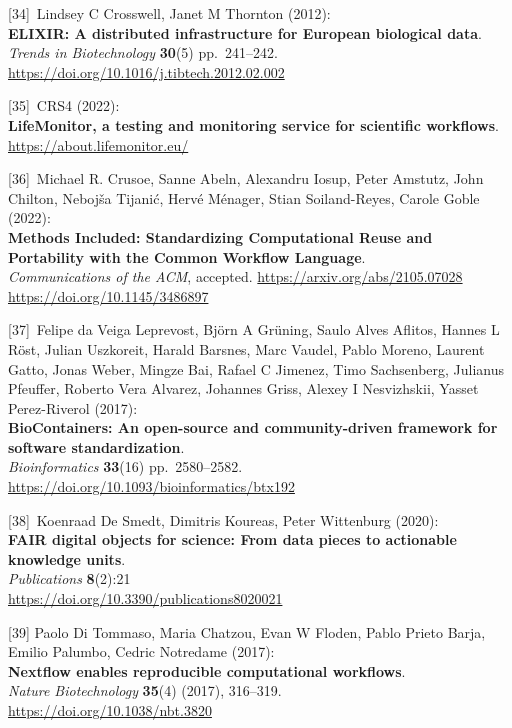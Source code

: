 {[}34{]}~Lindsey C Crosswell, Janet M Thornton (2012):\\
\textbf{ELIXIR: A distributed infrastructure for European biological
data}.\\
\emph{Trends in Biotechnology} \textbf{30}(5) pp.~241--242.\\
\url{https://doi.org/10.1016/j.tibtech.2012.02.002}

{[}35{]}~CRS4 (2022):\\
\textbf{LifeMonitor, a testing and monitoring service for scientific
workflows}.\\
\url{https://about.lifemonitor.eu/}

{[}36{]}~Michael R. Crusoe, Sanne Abeln, Alexandru Iosup, Peter Amstutz,
John Chilton, Nebojša Tijanić, Hervé Ménager, Stian Soiland-Reyes,
Carole Goble (2022):\\
\textbf{Methods Included: Standardizing Computational Reuse and
Portability with the Common Workflow Language}.\\
\emph{Communications of the ACM}, accepted.
\url{https://arxiv.org/abs/2105.07028}\\
\url{https://doi.org/10.1145/3486897}

{[}37{]}~Felipe da Veiga Leprevost, Björn A Grüning, Saulo Alves
Aflitos, Hannes L Röst, Julian Uszkoreit, Harald Barsnes, Marc Vaudel,
Pablo Moreno, Laurent Gatto, Jonas Weber, Mingze Bai, Rafael C Jimenez,
Timo Sachsenberg, Julianus Pfeuffer, Roberto Vera Alvarez, Johannes
Griss, Alexey I Nesvizhskii, Yasset Perez-Riverol (2017):\\
\textbf{BioContainers: An open-source and community-driven framework for
software standardization}.\\
\emph{Bioinformatics} \textbf{33}(16) pp.~2580--2582.\\
\url{https://doi.org/10.1093/bioinformatics/btx192}

{[}38{]}~Koenraad De Smedt, Dimitris Koureas, Peter Wittenburg (2020):\\
\textbf{FAIR digital objects for science: From data pieces to actionable
knowledge units}.\\
\emph{Publications} \textbf{8}(2):21\\
\url{https://doi.org/10.3390/publications8020021}

{[}39{]} Paolo Di Tommaso, Maria Chatzou, Evan W Floden, Pablo Prieto
Barja, Emilio Palumbo, Cedric Notredame (2017):\\
\textbf{Nextflow enables reproducible computational workflows}.\\
\emph{Nature Biotechnology} \textbf{35}(4) (2017), 316--319.\\
\url{https://doi.org/10.1038/nbt.3820}


